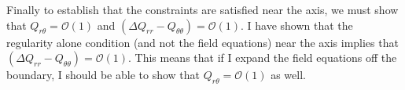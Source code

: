 \documentclass[aps,prd,amsmath,showpacs,amssymb,superscriptaddress,nofootinbib,longbibliography,eqsecnum,preprintnumbers]{revtex4-1}
\begin{document}
Finally to establish that the constraints are satisfied near the axis, we must show that $Q_{r\theta} =\mathcal{O}(1)$ and $(\Delta Q_{rr}-Q_{\theta\theta})=\mathcal{O}(1)$. I have shown that the regularity alone condition (and not the field equations) near the axis implies that $(\Delta Q_{rr}-Q_{\theta\theta})=\mathcal{O}(1)$. This means that if I expand the field equations off the boundary, I should be able to show that $Q_{r\theta} =\mathcal{O}(1)$ as well.


\end{document}
